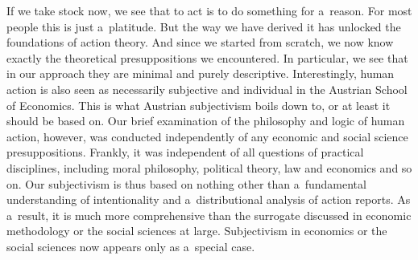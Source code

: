 If we take stock now, we see that to act is to do something for a~reason. For most people this is just a~platitude. But the way we have derived it has unlocked the foundations of action theory. And since we started from scratch, we now know exactly the theoretical presuppositions we encountered. In particular, we see that in our approach they are minimal and purely descriptive. Interestingly, human action is also seen as necessarily subjective and individual in the Austrian School of Economics. This is what Austrian subjectivism boils down to, or at least it should be based on. Our brief examination of the philosophy and logic of human action, however, was conducted independently of any economic and social science presuppositions. Frankly, it was independent of all questions of practical disciplines, including moral philosophy, political theory, law and economics and so on. Our subjectivism is thus based on nothing other than a~fundamental understanding of intentionality and a~distributional analysis of action reports. As a~result, it is much more comprehensive than the surrogate discussed in economic methodology or the social sciences at large. Subjectivism in economics or the social sciences now appears only as a~special case.



